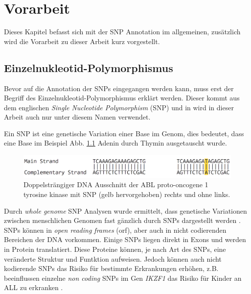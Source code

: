 \chapter{Vorarbeit}

Dieses Kapitel befasst sich mit der \ac{SNP} Annotation im allgemeinen, zusätzlich wird die Vorarbeit zu dieser Arbeit kurz vorgestellt.




\section{Einzelnukleotid-Polymorphismus}
Bevor auf die Annotation der \ac{SNPs} eingegangen werden kann, muss erst der Begriff des Einzelnukleotid-Polymorphismus erklärt werden. Dieser kommt aus dem englischen \emph{Single Nucleotide Polymorphism} (SNP) und in wird in dieser Arbeit auch nur unter diesem Namen verwendet.

Ein \ac{SNP} ist eine genetische Variation einer Base im Genom, dies bedeutet, dass eine Base im Beispiel Abb. \ref{fig:snp} Adenin durch Thymin ausgetauscht wurde.

\begin{figure}
\centering
\includegraphics[width=.95\textwidth]{images/DNA_ds_strand_with_snp.png}
\caption{Doppelsträngiger DNA Ausschnitt der ABL proto-oncogene 1 tyrosine kinase mit \ac{SNP} (gelb hervorgehoben) rechts und ohne links.}
\label{fig:snp}
\end{figure}



Durch \emph{whole genome} \ac{SNP} Analysen wurde ermittelt, dass genetische Variationen zwischen menschlichen Genomen fast gänzlich durch \ac{SNPs} dargestellt werden \cite{Do.2015}. 
\ac{SNPs} können in \emph{open reading frames} (orf), aber auch in nicht codierenden Bereichen der DNA vorkommen. Einige \ac{SNPs} liegen direkt in Exons und werden in Protein translatiert. Diese Proteine können, je nach Art des \ac{SNPs}, eine veränderte Struktur und Funtktion aufweisen. Jedoch können auch nicht kodierende \ac{SNPs} das Risiko für bestimmte Erkrankungen erhöhen, z.B. beeinflussen einzelne \emph{non coding} \ac{SNPs} im Gen \emph{IKZF1} das Risiko für Kinder an ALL zu erkranken \cite{Papaemmanuil.2009}.

